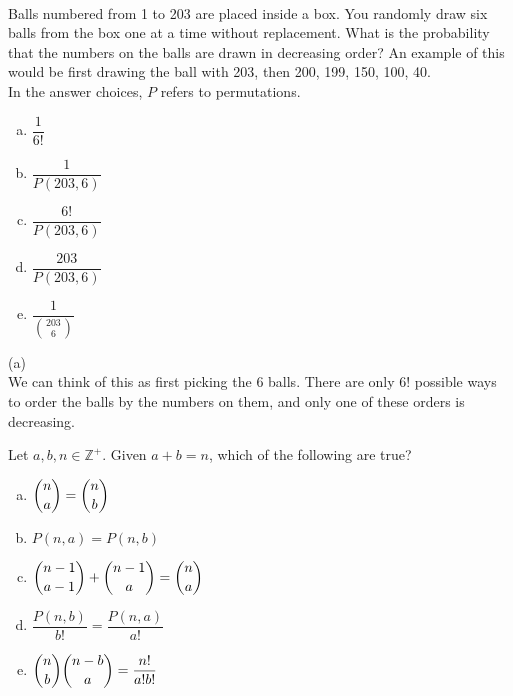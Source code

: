 \begin{solution}
\begin{solution}
\end{solution}
\\
Balls numbered from 1 to 203 are placed inside a box. You randomly draw six balls from the box one at a time without replacement. What is the probability that the numbers on the balls are drawn in decreasing order? An example of this would be first drawing the ball with 203, then 200, 199, 150, 100, 40. \\
In the answer choices, $P$ refers to permutations.
\begin{enumerate}[(a)]
	\item  $\dfrac{1}{6!}$

	\item  $\dfrac{1}{P(203, 6)}$

	\item  $\dfrac{6!}{P(203, 6)}$

	\item  $\dfrac{203}{P(203, 6)}$

	\item  $\dfrac{1}{\binom{203}6}$


\end{enumerate}
\begin{solution}

(a)\\
We can think of this as first picking the 6 balls. There are only 6! possible ways to order the balls by the numbers on them, and only one of these orders is decreasing.

\end{solution}


Let $a,b,n \in \mathbb{Z}^+$. Given $a+b = n$, which of the following are true?
\begin{enumerate}[(a)]
	\item {$\dbinom{n}{a} = \dbinom{n}{b}$}

	\item {$P(n,a) = P(n,b)$}

	\item {$\dbinom{n-1}{a-1} + \dbinom{n-1}{a} = \dbinom{n}{a}$}

	\item {$\dfrac{P(n,b)}{b!} = \dfrac{P(n,a)}{a!}$}

	\item {$\dbinom{n}{b}\dbinom{n-b}{a} = \dfrac{n!}{a!b!}$}


\end{enumerate}
\begin{solution}


\end{solution}
\end{solution}
